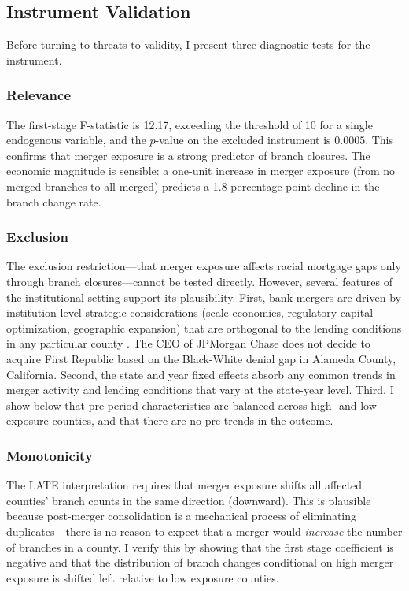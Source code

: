 \documentclass[12pt]{article}
\begin{document}
\subsection{Instrument Validation}

Before turning to threats to validity, I present three diagnostic tests for the instrument.

\subsubsection*{Relevance} The first-stage F-statistic is 12.17, exceeding the \citet{sunandabraham2021} threshold of 10 for a single endogenous variable, and the $p$-value on the excluded instrument is $0.0005$. This confirms that merger exposure is a strong predictor of branch closures. The economic magnitude is sensible: a one-unit increase in merger exposure (from no merged branches to all merged) predicts a 1.8 percentage point decline in the branch change rate.

\subsubsection*{Exclusion} The exclusion restriction---that merger exposure affects racial mortgage gaps only through branch closures---cannot be tested directly. However, several features of the institutional setting support its plausibility. First, bank mergers are driven by institution-level strategic considerations (scale economies, regulatory capital optimization, geographic expansion) that are orthogonal to the lending conditions in any particular county \citep{erel2011}. The CEO of JPMorgan Chase does not decide to acquire First Republic based on the Black-White denial gap in Alameda County, California. Second, the state and year fixed effects absorb any common trends in merger activity and lending conditions that vary at the state-year level. Third, I show below that pre-period characteristics are balanced across high- and low-exposure counties, and that there are no pre-trends in the outcome.

\subsubsection*{Monotonicity} The LATE interpretation requires that merger exposure shifts all affected counties' branch counts in the same direction (downward). This is plausible because post-merger consolidation is a mechanical process of eliminating duplicates---there is no reason to expect that a merger would \emph{increase} the number of branches in a county. I verify this by showing that the first stage coefficient is negative and that the distribution of branch changes conditional on high merger exposure is shifted left relative to low exposure counties.
\end{document}

